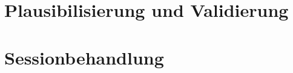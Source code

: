 
\section{Plausibilisierung und Validierung}
\begin{quote}
\end{quote}

\section{Sessionbehandlung}
\begin{quote}
\end{quote}

